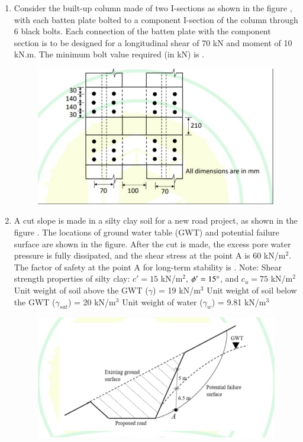 \documentclass[journal,12pt,onecolumn]{article}
\theoremstyle{remark}
\begin{document}
\begin{enumerate}
\hfill{}

\item Consider the built-up column made of two I-sections as shown in the figure , with each batten plate bolted to a component I-section of the column through 6 black bolts. Each connection of the batten plate with the component section is to be designed for a longitudinal shear of 70 kN and moment of 10 kN.m. The minimum bolt value required (in kN) is \underline{\hspace{2cm}} .
\begin{figure}[H]
    \centering
    \includegraphics[width=0.7\columnwidth]{figs/1q-54.jpg}
    \caption{}
    \label{fig:q54}
\end{figure}

\hfill{}

\item A cut slope is made in a silty clay soil for a new road project, as shown in the figure . The locations of ground water table (GWT) and potential failure surface are shown in the figure. After the cut is made, the excess pore water pressure is fully dissipated, and the shear stress at the point A is 60 kN/m$^2$. The factor of safety at the point A for long-term stability is \underline{\hspace{2cm}} .
Note:
Shear strength properties of silty clay: $c' = 15$ kN/m$^2$, $\phi' = 15\degree$, and $c_u = 75$ kN/m$^2$
Unit weight of soil above the GWT ($\gamma$) = 19 kN/m$^3$
Unit weight of soil below the GWT ($\gamma_{sat}$) = 20 kN/m$^3$
Unit weight of water ($\gamma_w$) = 9.81 kN/m$^3$
\begin{figure}[H]
    \centering
    \includegraphics[width=0.7\columnwidth]{figs/1q-55.jpg}
    \caption{}
    \label{fig:q55}
\end{figure}


\end{enumerate}
\end{document}
